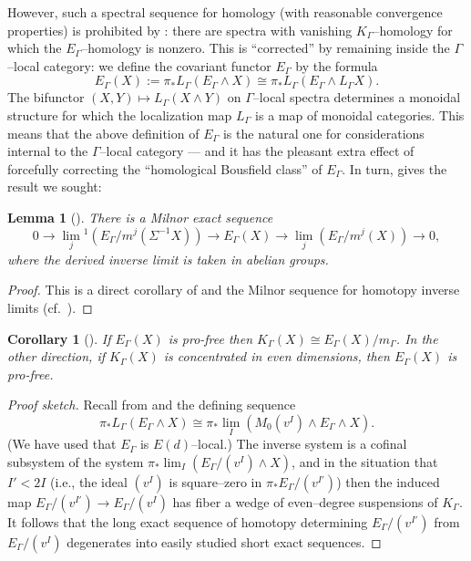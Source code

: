 \documentclass{amsart}
\newcommand{\m}{m}
\newcommand{\<}{\langle}
\renewcommand{\>}{\rangle}
\newcommand{\sm}{\wedge}
\newcommand{\Susp}{\Sigma}
\theoremstyle{plain}
\newtheorem*{lemma}{Lemma}
\newtheorem*{corollary}{Corollary}
\theoremstyle{definition}
\theoremstyle{remark}
\begin{document}
However, such a spectral sequence for homology (with reasonable convergence properties) is prohibited by : there are spectra with vanishing $K_\Gamma$--homology for which the $E_\Gamma$--homology is nonzero.  This is ``corrected'' by remaining inside the $\Gamma$--local category: we define the covariant functor $E_\Gamma$ by the formula \[E_\Gamma(X) := \pi_* L_\Gamma(E_\Gamma \sm X) \cong \pi_* L_\Gamma(E_\Gamma \sm L_\Gamma X).\]  The bifunctor $(X, Y) \mapsto L_\Gamma(X \sm Y)$ on $\Gamma$--local spectra determines a monoidal structure for which the localization map $L_\Gamma$ is a map of monoidal categories.  This means that the above definition of $E_\Gamma$ is the natural one for considerations internal to the $\Gamma$--local category --- and it has the pleasant extra effect of forcefully correcting the ``homological Bousfield class'' of $E_\Gamma$.  In turn,  gives the result we sought:

\begin{lemma}[{\cite[Propositions 7.10 and 8.4]{HoveyStrickland}}]\label{MilnorSeqForEThy}
There is a Milnor exact sequence \[ 0 \to \lim_j{}^1 (E_\Gamma/\m^j (\Susp^{-1} X)) \to E_\Gamma(X) \to \lim_j (E_\Gamma/\m^j(X)) \to 0,\] where the derived inverse limit is taken in abelian groups.
\end{lemma}
\begin{proof}
This is a direct corollary of  and the Milnor sequence for homotopy inverse limits (cf.\ ).
\end{proof}

\begin{corollary}[{\cite[Proposition 8.4]{HoveyStrickland}}]\label{EthyFromKthy}
If $E_\Gamma(X)$ is pro-free then $K_\Gamma(X) \cong E_\Gamma(X) / \m_\Gamma$.  In the other direction, if $K_\Gamma(X)$ is concentrated in even dimensions, then $E_\Gamma(X)$ is pro-free.
\end{corollary}
\begin{proof}[Proof sketch]
Recall from  and  the defining sequence
\[
\pi_* L_\Gamma(E_\Gamma \sm X) \cong \pi_* \lim_I \left( M_0(v^I) \sm E_\Gamma \sm X \right).
\]
(We have used that $E_\Gamma$ is $E(d)$--local.)  The inverse system is a cofinal subsystem of the system $\pi_* \lim_I \left(E_\Gamma / (v^I) \sm X \right)$, and in the situation that $I' < 2I$ (i.e., the ideal $(v^I)$ is square--zero in $\pi_* E_\Gamma / (v^{I'})$) then the induced map $E_\Gamma / (v^{I'}) \to E_\Gamma / (v^I)$ has fiber a wedge of even--degree suspensions of $K_\Gamma$.  It follows that the long exact sequence of homotopy determining $E_\Gamma / (v^{I'})$ from $E_\Gamma / (v^I)$ degenerates into easily studied short exact sequences.
\end{proof}
\end{document}
